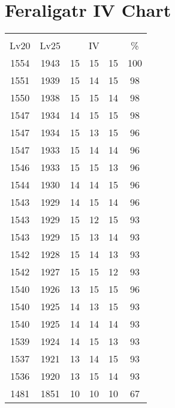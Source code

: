 \documentclass{article}%
\begin{document}
%
\normalsize%
\section{Feraligatr IV Chart}%
\label{sec:Feraligatr IV Chart}%
\renewcommand{\arraystretch}{1.5}%
\begin{tabular}{|c|c|c|c|c|c|}%
\hline%
\multicolumn{6}{|c|}{\textcolor{white}{ 
\linebreak{Feraligatr}
}%
\cellcolor{black}}\\%
\multicolumn{1}{|c}{Lv20}&\multicolumn{1}{c|}{Lv25}&\multicolumn{3}{c|}{IV}&\multicolumn{1}{|c|}{\%}\\%
\hline%
\rowcolor{color100}%
1554&1943&15&15&15&100\\%
\hline%
\rowcolor{color98}%
1551&1939&15&14&15&98\\%
\hline%
\rowcolor{color98}%
1550&1938&15&15&14&98\\%
\hline%
\rowcolor{color98}%
1547&1934&14&15&15&98\\%
\hline%
\rowcolor{color96}%
1547&1934&15&13&15&96\\%
\hline%
\rowcolor{color96}%
1547&1933&15&14&14&96\\%
\hline%
\rowcolor{color96}%
1546&1933&15&15&13&96\\%
\hline%
\rowcolor{color96}%
1544&1930&14&14&15&96\\%
\hline%
\rowcolor{color96}%
1543&1929&14&15&14&96\\%
\hline%
\rowcolor{color93}%
1543&1929&15&12&15&93\\%
\hline%
\rowcolor{color93}%
1543&1929&15&13&14&93\\%
\hline%
\rowcolor{color93}%
1542&1928&15&14&13&93\\%
\hline%
\rowcolor{color93}%
1542&1927&15&15&12&93\\%
\hline%
\rowcolor{color96}%
1540&1926&13&15&15&96\\%
\hline%
\rowcolor{color93}%
1540&1925&14&13&15&93\\%
\hline%
\rowcolor{color93}%
1540&1925&14&14&14&93\\%
\hline%
\rowcolor{color93}%
1539&1924&14&15&13&93\\%
\hline%
\rowcolor{color93}%
1537&1921&13&14&15&93\\%
\hline%
\rowcolor{color93}%
1536&1920&13&15&14&93\\%
\hline%
\rowcolor{color91}%
1481&1851&10&10&10&67\\%
\end{tabular}

%
\end{document}
